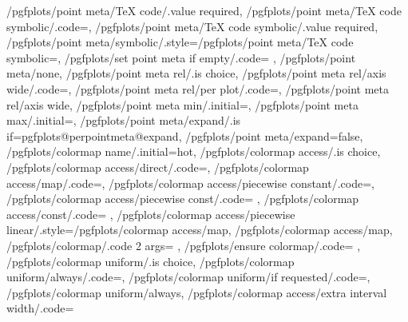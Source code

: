 {	/pgfplots/point meta/TeX code/.value required,
	/pgfplots/point meta/TeX code symbolic/.code={},%
	/pgfplots/point meta/TeX code symbolic/.value required,
	/pgfplots/point meta/symbolic/.style={/pgfplots/point meta/TeX code symbolic={\edef\pgfplotspointmeta{#1}}},
	/pgfplots/set point meta if empty/.code={%
		\ifx\pgfplotspointmetainputhandler\pgfutil@empty
		\fi
	},%
	/pgfplots/point meta/none,
	/pgfplots/point meta rel/.is choice,
	/pgfplots/point meta rel/axis wide/.code={\def\pgfplots@perpointmeta@rel@choice{0}},%
	/pgfplots/point meta rel/per plot/.code={\def\pgfplots@perpointmeta@rel@choice{1}},%
	/pgfplots/point meta rel/axis wide,%
	/pgfplots/point meta min/.initial=,%
	/pgfplots/point meta max/.initial=,%
	/pgfplots/point meta/expand/.is if=pgfplots@perpointmeta@expand,
	/pgfplots/point meta/expand=false,
	/pgfplots/colormap name/.initial=hot,
	/pgfplots/colormap access/.is choice,
	/pgfplots/colormap access/direct/.code={\def\pgfplots@colormap@access{d}},%
	/pgfplots/colormap access/map/.code={\def\pgfplots@colormap@access{m}},%
	/pgfplots/colormap access/piecewise constant/.code={\def\pgfplots@colormap@access{c}},%
	/pgfplots/colormap access/piecewise const/.code=   {\def\pgfplots@colormap@access{c}},%
	/pgfplots/colormap access/const/.code=             {\def\pgfplots@colormap@access{c}},%
	/pgfplots/colormap access/piecewise linear/.style={/pgfplots/colormap access/map},
	/pgfplots/colormap access/map,%
	/pgfplots/colormap/.code 2 args={%
	},
	/pgfplots/ensure colormap/.code={%
		\pgfplots@ensure@old@cm
		\pgfplots@ensure@old@cm
	},
	/pgfplots/colormap uniform/.is choice,
	/pgfplots/colormap uniform/always/.code={\def\pgfplots@colormap@uniform@choice{0}},
	/pgfplots/colormap uniform/if requested/.code={\def\pgfplots@colormap@uniform@choice{1}},
	/pgfplots/colormap uniform/always,
	/pgfplots/colormap access/extra interval width/.code={%
}}
